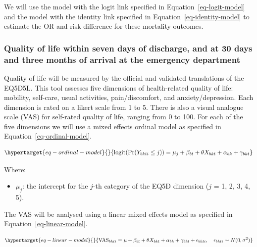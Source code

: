 \documentclass[
]{scrartcl}
\providecommand{\tightlist}{%
  \setlength{\itemsep}{0pt}\setlength{\parskip}{0pt}}\usepackage{longtable,booktabs,array}
\begin{document}
We will use the model with the logit link specified in
Equation~\ref{eq-logit-model} and the model with the identity link
specified in Equation~\ref{eq-identity-model} to estimate the OR and
risk difference for these mortality outcomes.

\hypertarget{quality-of-life-within-seven-days-of-discharge-and-at-30-days-and-three-months-of-arrival-at-the-emergency-department}{%
\subsubsection{Quality of life within seven days of discharge, and at 30
days and three months of arrival at the emergency
department}\label{quality-of-life-within-seven-days-of-discharge-and-at-30-days-and-three-months-of-arrival-at-the-emergency-department}}

Quality of life will be measured by the official and validated
translations of the EQ5D5L. This tool assesses five dimensions of
health-related quality of life: mobility, self-care, usual activities,
pain/discomfort, and anxiety/depression. Each dimension is rated on a
likert scale from 1 to 5. There is also a visual analogue scale (VAS)
for self-rated quality of life, ranging from 0 to 100. For each of the
five dimensions we will use a mixed effects ordinal model as specified
in Equation~\ref{eq-ordinal-model}.

\begin{equation}\protect\hypertarget{eq-ordinal-model}{}{
\text{logit}(\text{Pr}(Y_{bkti} \leq j)) = \mu_j + \beta_{bt} + \theta X_{bkt} + \alpha_{bk} + \gamma_{bkt}
}\label{eq-ordinal-model}\end{equation}

Where:

\begin{itemize}
\tightlist
\item
  \(\mu_j\): the intercept for the \(j\)-th category of the EQ5D
  dimension (\(j\) = 1, 2, 3, 4, 5).
\end{itemize}

The VAS will be analysed using a linear mixed effects model as specified
in Equation~\ref{eq-linear-model}.

\begin{equation}\protect\hypertarget{eq-linear-model}{}{
\text{VAS}_{bkti} = \mu + \beta_{bt} + \theta X_{bkt} + \alpha_{bk} + \gamma_{bkt} + \epsilon_{bkti}, \quad \epsilon_{bkti} \sim N(0, \sigma^2)
}\label{eq-linear-model}\end{equation}
\end{document}
